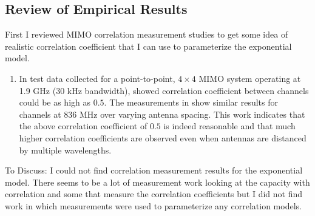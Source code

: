 \documentclass[12pt,a4paper]{report}
\begin{document}
\subsection{Review of Empirical Results}
First I reviewed MIMO correlation measurement studies to get some idea of realistic correlation coefficient that I can use to parameterize the exponential model. 
\begin{enumerate}
\item
In test data collected for a point-to-point, $4 \times 4$ MIMO system  operating at 1.9 GHz (30 kHz bandwidth), \cite{martin2000multiple} showed correlation coefficient between channels could be as high as $0.5$. 
The measurements in \cite{lee1973effects} show similar results for channels at 836 MHz over varying antenna spacing. This work indicates that the above correlation coefficient of $0.5$ is indeed reasonable and that much higher correlation coefficients are observed even when antennas are distanced by multiple wavelengths.

\end{enumerate}
To Discuss: I could not find correlation measurement results for the exponential model. There seems to be a lot of measurement work looking at the capacity with correlation and some that measure the correlation coefficients but I did not find work in which measurements were used to parameterize any correlation models.
\end{document}
